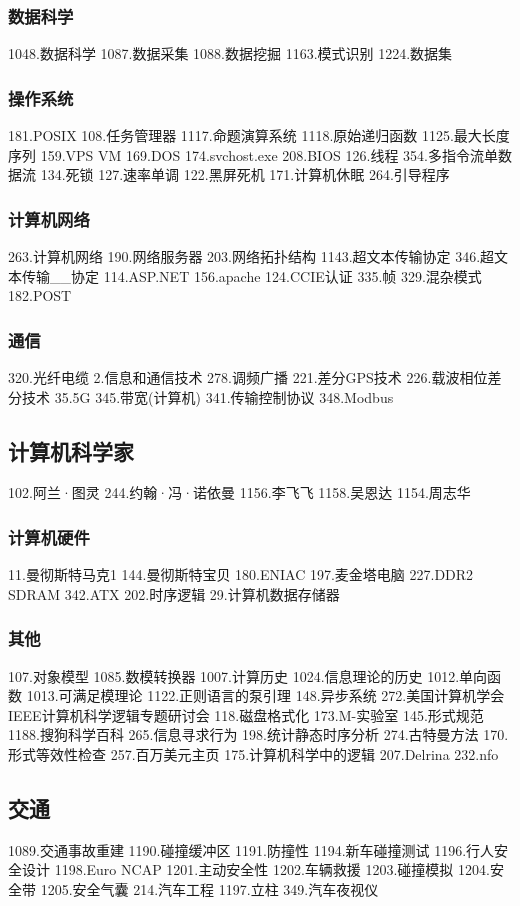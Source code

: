 \subsubsection{数据科学}
1048.数据科学
1087.数据采集
1088.数据挖掘
1163.模式识别
1224.数据集
\subsubsection{操作系统}
181.POSIX
108.任务管理器
1117.命题演算系统
1118.原始递归函数
1125.最大长度序列
159.VPS VM
169.DOS
174.svchost.exe
208.BIOS
126.线程
354.多指令流单数据流
134.死锁
127.速率单调
122.黑屏死机
171.计算机休眠
264.引导程序
\subsubsection{计算机网络}
263.计算机网络
190.网络服务器
203.网络拓扑结构
1143.超文本传输协定
346.超文本传输__协定
114.ASP.NET
156.apache
124.CCIE认证
335.帧
329.混杂模式
182.POST
\subsubsection{通信}
320.光纤电缆
2.信息和通信技术
278.调频广播
221.差分GPS技术
226.载波相位差分技术
35.5G
345.带宽(计算机)
341.传输控制协议
348.Modbus 
\subsection{计算机科学家}
102.阿兰·图灵
244.约翰·冯·诺依曼
1156.李飞飞
1158.吴恩达
1154.周志华
\subsubsection{计算机硬件}
11.曼彻斯特马克1
144.曼彻斯特宝贝
180.ENIAC 197.麦金塔电脑
227.DDR2 SDRAM
342.ATX
202.时序逻辑
29.计算机数据存储器
\subsubsection{其他}
107.对象模型
1085.数模转换器
1007.计算历史
1024.信息理论的历史
1012.单向函数
1013.可满足模理论
1122.正则语言的泵引理
148.异步系统
272.美国计算机学会IEEE计算机科学逻辑专题研讨会
118.磁盘格式化
173.M-实验室
145.形式规范
1188.搜狗科学百科
265.信息寻求行为
198.统计静态时序分析
274.古特曼方法
170.形式等效性检查
257.百万美元主页
175.计算机科学中的逻辑
207.Delrina
232.nfo

\subsection{交通}
1089.交通事故重建
1190.碰撞缓冲区
1191.防撞性
1194.新车碰撞测试
1196.行人安全设计
1198.Euro NCAP
1201.主动安全性
1202.车辆救援
1203.碰撞模拟
1204.安全带
1205.安全气囊
214.汽车工程
1197.立柱
349.汽车夜视仪

